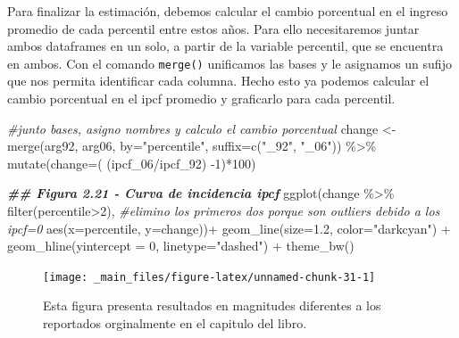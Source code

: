 \documentclass[
]{book}
\newenvironment{Shaded}{\begin{snugshade}}{\end{snugshade}}
\newcommand{\AttributeTok}[1]{\textcolor[rgb]{0.77,0.63,0.00}{#1}}
\newcommand{\CommentTok}[1]{\textcolor[rgb]{0.56,0.35,0.01}{\textit{#1}}}
\newcommand{\DecValTok}[1]{\textcolor[rgb]{0.00,0.00,0.81}{#1}}
\newcommand{\DocumentationTok}[1]{\textcolor[rgb]{0.56,0.35,0.01}{\textbf{\textit{#1}}}}
\newcommand{\FloatTok}[1]{\textcolor[rgb]{0.00,0.00,0.81}{#1}}
\newcommand{\FunctionTok}[1]{\textcolor[rgb]{0.00,0.00,0.00}{#1}}
\newcommand{\NormalTok}[1]{#1}
\newcommand{\OtherTok}[1]{\textcolor[rgb]{0.56,0.35,0.01}{#1}}
\newcommand{\SpecialCharTok}[1]{\textcolor[rgb]{0.00,0.00,0.00}{#1}}
\newcommand{\StringTok}[1]{\textcolor[rgb]{0.31,0.60,0.02}{#1}}
\begin{document}
Para finalizar la estimación, debemos calcular el cambio porcentual en el ingreso promedio de cada percentil entre estos años. Para ello necesitaremos juntar ambos dataframes en un solo, a partir de la variable percentil, que se encuentra en ambos. Con el comando \texttt{merge()} unificamos las bases y le asignamos un sufijo que nos permita identificar cada columna. Hecho esto ya podemos calcular el cambio porcentual en el ipcf promedio y graficarlo para cada percentil.

\begin{Shaded}
\begin{Highlighting}[]
\CommentTok{\#junto bases, asigno nombres y calculo el cambio porcentual}
\NormalTok{change }\OtherTok{\textless{}{-}} \FunctionTok{merge}\NormalTok{(arg92, arg06, }\AttributeTok{by=}\StringTok{"percentile"}\NormalTok{, }\AttributeTok{suffix=}\FunctionTok{c}\NormalTok{(}\StringTok{"\_92"}\NormalTok{, }\StringTok{"\_06"}\NormalTok{)) }\SpecialCharTok{\%\textgreater{}\%} 
          \FunctionTok{mutate}\NormalTok{(}\AttributeTok{change=}\NormalTok{( (ipcf\_06}\SpecialCharTok{/}\NormalTok{ipcf\_92) }\SpecialCharTok{{-}}\DecValTok{1}\NormalTok{)}\SpecialCharTok{*}\DecValTok{100}\NormalTok{) }


\DocumentationTok{\#\# Figura 2.21 {-} Curva de incidencia ipcf}
\FunctionTok{ggplot}\NormalTok{(change }\SpecialCharTok{\%\textgreater{}\%} \FunctionTok{filter}\NormalTok{(percentile}\SpecialCharTok{\textgreater{}}\DecValTok{2}\NormalTok{),    }\CommentTok{\#elimino los primeros dos porque son outliers debido a los ipcf=0}
       \FunctionTok{aes}\NormalTok{(}\AttributeTok{x=}\NormalTok{percentile, }\AttributeTok{y=}\NormalTok{change))}\SpecialCharTok{+}
  \FunctionTok{geom\_line}\NormalTok{(}\AttributeTok{size=}\FloatTok{1.2}\NormalTok{, }\AttributeTok{color=}\StringTok{"darkcyan"}\NormalTok{) }\SpecialCharTok{+}
  \FunctionTok{geom\_hline}\NormalTok{(}\AttributeTok{yintercept =} \DecValTok{0}\NormalTok{, }\AttributeTok{linetype=}\StringTok{"dashed"}\NormalTok{) }\SpecialCharTok{+}
  \FunctionTok{theme\_bw}\NormalTok{()}
\end{Highlighting}
\end{Shaded}

\begin{figure}
\texttt{[image: \_main\_files/figure-latex/unnamed-chunk-31-1]} \caption{Esta figura presenta resultados en magnitudes diferentes a los reportados orginalmente en el capitulo del libro.}\label{fig:unnamed-chunk-31}
\end{figure}
\end{document}
